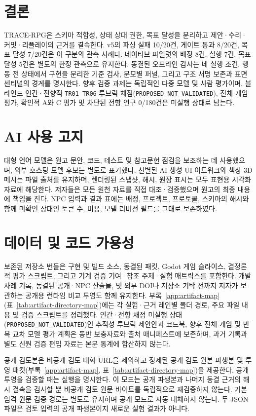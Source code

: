 \documentclass[journal]{IEEEtran}
\newcommand{\system}{TRACE-RPG}
\begin{document}
\section{결론}
\system{}은 스키마 적합성, 상태 상대 권한, 목표 달성을 분리하고 제안·수리·커밋·리플레이의 근거를 결속한다. v5의 파싱 실패 10/20건, 게이트 통과 8/20건, 목표 달성 7/20건은 이 구분의 관측 사례다. 네이티브 파일럿의 배정 8건, 실행 7건, 목표 달성 5건은 별도의 한정 관측으로 유지한다. 동결된 오프라인 감사는 네 실행 조건, 행동 전 상태에서 구현을 분리한 기준 검사, 분모별 퍼널, 그리고 구조 서명 보존과 표면 센티널의 경계를 명시한다. 향후 검증 과제는 독립적인 다중 모델 및 사람 평가이며, 블라인드 인간·전향적 \texttt{TR01--TR06} 루브릭 채점(\texttt{PROPOSED\_NOT\_VALIDATED}), 전체 게임 평가, 확인적 A와 C 평가 및 차단된 전향 연구 0/180건은 미실행 상태로 남는다.

\begingroup
\section*{AI 사용 고지}
대형 언어 모델은 원고 문안, 코드, 테스트 및 참고문헌 점검을 보조하는 데 사용했으며, 외부 호스팅 모델 후보는 별도로 표기했다. 선별된 AI 생성 UI 아트워크와 책상 3D 메시는 파일 출처를 유지하며, 렌더링된 스냅샷, 해시, 원장 표시는 모두 표현용 시각화 자료에 해당한다. 저자들은 모든 원천 자료를 직접 대조·검증했으며 원고의 최종 내용에 책임을 진다. NPC 입력과 결과 표에는 배정, 프로젝트, 프로토콜, 스키마의 해시와 함께 미확인 상태인 토큰 수, 비용, 모델 리비전 필드를 그대로 보존하였다.
\section*{데이터 및 코드 가용성}
보존된 저장소 번들은 구현 및 빌드 소스, 동결된 패킷, Godot 게임 슬라이스, 결정론적 평가 스크립트, 그리고 기계 검증 기여·참조 주제·실험 매트릭스를 포함한다. 개발 사례 기록, 동결된 공개·NPC 산출물, 및 외부 DOI나 저장소 기탁 전까지 저자가 보관하는 공개용 런타임 비교 투영도 함께 유지한다. 부록~\ref{app:artifact-map}(표~\ref{tab:artifact-directory-map})에는 각 실험·근거 레인별 폴더 경로, 주요 파일 내용 및 검증 스크립트를 정리했다. 인간·전향 채점 미실행 상태(\texttt{PROPOSED\_NOT\_VALIDATED})인 추적성 루브릭 제안안과 코드북, 향후 전체 게임 및 반복 교차 모델 평가 계획은 동반 보충자료와 출처 매니페스트에 보존하며, 과거 기록과 별도 신원 검증 편입 자료는 본문 통계에 합산하지 않는다.

공개 검토본은 비공개 검토 대화 URL을 제외하고 정제된 공개 검토 원본 파생본 및 투영 패킷(부록~\ref{app:artifact-map}, 표~\ref{tab:artifact-directory-map})을 제공한다. 공개 투영을 검증할 때는  실행을 명시한다. 이 모드는 공개 파생본과 나머지 동결 근거의 해시 결속을 검사할 뿐 비공개 검토 원문 바이트를 독립적으로 재검증하지 않는다. 기본 엄격 원문 검증 경로는 별도로 유지하며 공개 모드로 자동 대체하지 않는다. 두 JSON 파일은 검토 입력의 공개 파생본이지 새로운 실험 결과가 아니다.
\end{document}
